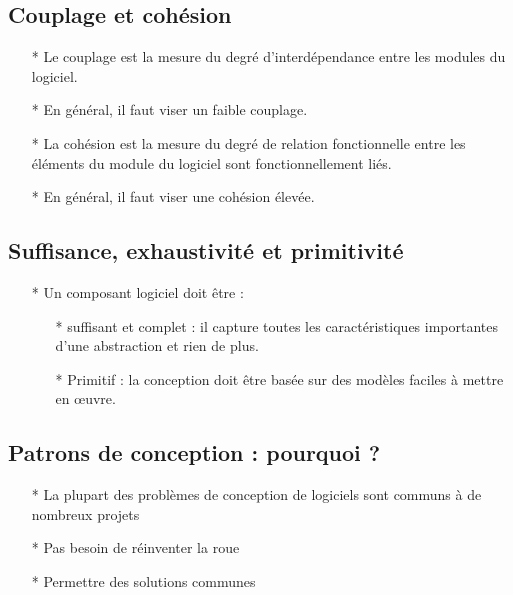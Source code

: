 \documentclass[12pt]{article}
\begin{document}
\subsection{Couplage et cohésion}
\begin{itemize}
	\item[* ] Le couplage est la mesure du degré d'interdépendance entre les modules
	du logiciel.
	\item[* ] En général, il faut viser un faible couplage.
\item[* ] La cohésion est la mesure du degré de relation fonctionnelle entre les éléments du module
du logiciel sont fonctionnellement liés.
\item[* ] En général, il faut viser une cohésion élevée.
\end{itemize}
\subsection{Suffisance, exhaustivité et primitivité}
\begin{itemize}
	\item[* ] Un composant logiciel doit être :
	\begin{itemize}
		\item[* ] suffisant et complet : il capture toutes les caractéristiques importantes d'une abstraction
		et rien de plus.
		\item[* ] Primitif : la conception doit être basée sur des modèles faciles à mettre en œuvre.
	\end{itemize}
\end{itemize}
\subsection{Patrons de conception : pourquoi ?}
\begin{itemize}
	\item[* ] La plupart des problèmes de conception de logiciels sont communs à de nombreux projets
	\item[* ] Pas besoin de réinventer la roue
	\item[* ] Permettre des solutions communes
\end{itemize}
\end{document}
